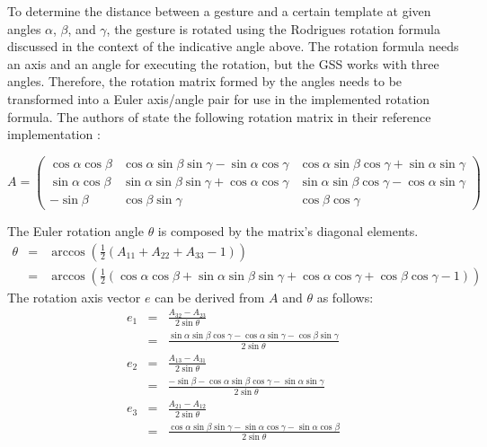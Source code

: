 To determine the distance between a gesture and a certain template at given angles $ \alpha $, $ \beta $, and $ \gamma $, the gesture is rotated using the Rodrigues rotation formula discussed in the context of the indicative angle above. The rotation formula needs an axis and an angle for executing the rotation, but the \ac{GSS} works with three angles. Therefore, the rotation matrix formed by the angles needs to be transformed into a Euler axis/angle pair for use in the implemented rotation formula. The authors of \cite{Kratz2010} state the following rotation matrix in their reference implementation \cite{repo:3dollar}:

\[
A = 
\begin{pmatrix}
\cos{\alpha}\cos{\beta} & \cos{\alpha}\sin{\beta}\sin{\gamma} - \sin{\alpha}\cos{\gamma} & \cos{\alpha}\sin{\beta}\cos{\gamma} + \sin{\alpha}\sin{\gamma} \\
\sin{\alpha}\cos{\beta} & \sin{\alpha}\sin{\beta}\sin{\gamma} + \cos{\alpha}\cos{\gamma} & \sin{\alpha}\sin{\beta}\cos{\gamma} - \cos{\alpha}\sin{\gamma} \\
-\sin{\beta} & \cos{\beta}\sin{\gamma} & \cos{\beta}\cos{\gamma}
\end{pmatrix}
\]

The Euler rotation angle $ \theta $ is composed by the matrix's diagonal elements.
\begin{eqnarray*}
\theta & = & \arccos(\frac{1}{2}(A_{11} + A_{22} + A_{33} - 1)) \\
       & = & \arccos(\frac{1}{2}(\cos\alpha\cos\beta+\sin\alpha\sin\beta\sin\gamma+\cos\alpha\cos\gamma+\cos\beta\cos\gamma-1))
\end{eqnarray*}
The rotation axis vector $ e $ can be derived from $ A $ and $ \theta $ as follows:
\begin{eqnarray*}
e_1 & = &  \frac{A_{32} - A_{23}}{2\sin\theta} \\
    & = & \frac{\sin\alpha\sin\beta\cos\gamma-\cos\alpha\sin\gamma-\cos\beta\sin\gamma}{2\sin\theta} \\
e_2 & = & \frac{A_{13} - A_{31}}{2\sin\theta} \\
    & = & \frac{-\sin\beta-\cos\alpha\sin\beta\cos\gamma-\sin\alpha\sin\gamma}{2\sin\theta} \\
e_3 & = & \frac{A_{21} - A_{12}}{2\sin\theta} \\
    & = & \frac{\cos\alpha\sin\beta\sin\gamma-\sin\alpha\cos\gamma-\sin\alpha\cos\beta}{2\sin\theta}
\end{eqnarray*}

